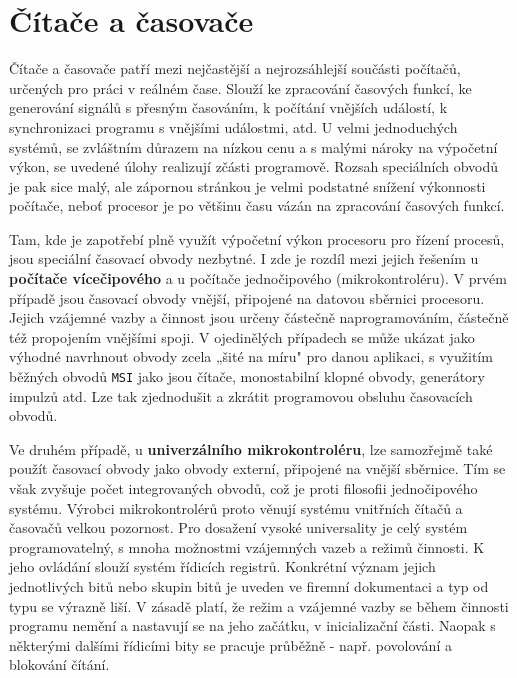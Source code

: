   \section{Čítače a časovače}\label{ces:IchapIVsecVI}
    Čítače a časovače patří mezi nejčastější a nejrozsáhlejší součásti počítačů, určených pro práci 
    v reálném čase. Slouží ke zpracování časových funkcí, ke generování signálů s přesným 
    časováním, k počítání vnějších událostí, k synchronizaci programu s vnějšími událostmi, atd. U 
    velmi jednoduchých systémů, se zvláštním důrazem na nízkou cenu a s malými nároky na výpočetní 
    výkon, se uvedené úlohy realizují zčásti programově. Rozsah speciálních obvodů je pak sice 
    malý, ale zápornou stránkou je velmi podstatné snížení výkonnosti počítače, neboť procesor je 
    po většinu času vázán na zpracování časových funkcí.
    
    Tam, kde je zapotřebí plně využít výpočetní výkon procesoru pro řízení procesů, jsou speciální 
    časovací obvody nezbytné. I zde je rozdíl mezi jejich řešením u\textbf{ počítače vícečipového} 
    a u počítače jednočipového (mikrokontroléru). V prvém případě jsou časovací obvody vnější, 
    připojené na datovou sběrnici procesoru. Jejich vzájemné vazby a činnost jsou určeny částečně 
    naprogramováním, částečně též propojením vnějšími spoji. V ojedinělých případech se může ukázat 
    jako výhodné navrhnout obvody zcela „šité na míru" pro danou aplikaci, s využitím běžných 
    obvodů \texttt{MSI} jako jsou čítače, monostabilní klopné obvody, generátory impulzů atd. Lze 
    tak zjednodušit a zkrátit programovou obsluhu časovacích obvodů.
    
    Ve druhém případě, u \textbf{univerzálního mikrokontroléru}, lze samozřejmě také použít 
    časovací obvody jako obvody externí, připojené na vnější sběrnice. Tím se však zvyšuje počet 
    integrovaných obvodů, což je proti filosofii jednočipového systému. Výrobci mikrokontrolérů 
    proto věnují systému vnitřních čítačů a časovačů velkou pozornost. Pro dosažení vysoké 
    universality je celý systém programovatelný, s mnoha možnostmi vzájemných vazeb a režimů 
    činnosti. K jeho ovládání slouží systém řídicích registrů. Konkrétní význam jejich jednotlivých 
    bitů nebo skupin bitů je uveden ve firemní dokumentaci a typ od typu se výrazně liší. V zásadě 
    platí, že režim a vzájemné vazby se během činnosti programu nemění a nastavují se na jeho 
    začátku, v inicializační části. Naopak s některými dalšími řídicími bity se pracuje průběžně - 
    např. povolování a blokování čítání.
    
